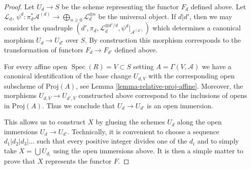 \documentclass{stacks-project}
\theoremstyle{plain}
\theoremstyle{definition}
\theoremstyle{remark}
\numberwithin{equation}{subsection}
\def\Spec{\mathop{\mathrm{Spec}}}
\begin{document}
\begin{proof}
Let $U_d \to S$ be the scheme representing the functor $F_d$
defined above. Let $\mathcal{L}_d$,
$\psi^d : \pi_d^*\mathcal{A}^{(d)} \to
\bigoplus_{n \geq 0} \mathcal{L}_d^{\otimes n}$ be the universal object.
If $d | d'$, then we may consider the quadruple
$(d', \pi_d, \mathcal{L}_d^{\otimes d'/d}, \psi^d|_{\mathcal{A}^{(d')}})$
which determines a canonical morphism $U_d \to U_{d'}$ over $S$.
By construction this morphism corresponds to the transformation
of functors $F_d \to F_{d'}$ defined above.

\medskip\noindent
For every affine open $\Spec(R) = V \subset S$
setting $A = \Gamma(V, \mathcal{A})$ we have a canonical
identification of the base change $U_{d, V}$ with the corresponding open
subscheme of $\text{Proj}(A)$, see Lemma \ref{lemma-relative-proj-affine}.
Moreover, the morphisms $U_{d, V} \to U_{d', V}$ constructed above
correspond to the inclusions of opens in $\text{Proj}(A)$.
Thus we conclude that $U_d \to U_{d'}$ is an open immersion.

\medskip\noindent
This allows us to construct $X$
by glueing the schemes $U_d$ along the open immersions $U_d \to U_{d'}$.
Technically, it is convenient to choose a sequence
$d_1 | d_2 | d_3 | \ldots$ such that every positive integer
divides one of the $d_i$ and to simply take
$X = \bigcup U_{d_i}$ using the open immersions above.
It is then a simple matter to prove that $X$ represents the
functor $F$.
\end{proof}
\end{document}
